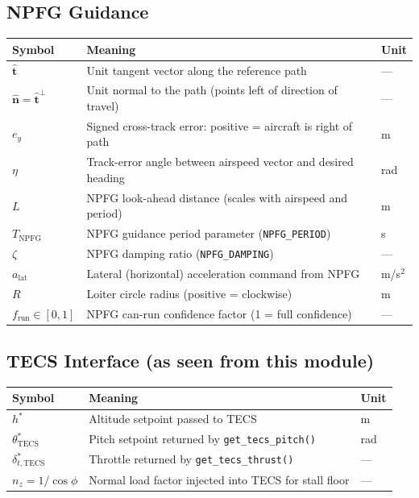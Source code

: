 \documentclass[12pt,a4paper]{article}
\begin{document}
\subsection*{NPFG Guidance}
\begin{center}\begin{tabular}{lll}\toprule
Symbol & Meaning & Unit \\\midrule
$\hat{\mathbf{t}}$ & Unit tangent vector along the reference path & --- \\
$\hat{\mathbf{n}} = \hat{\mathbf{t}}^{\perp}$ & Unit normal to the path (points left of direction of travel) & --- \\
$e_y$ & Signed cross-track error: positive = aircraft is right of path & m \\
$\eta$ & Track-error angle between airspeed vector and desired heading & rad \\
$L$ & NPFG look-ahead distance (scales with airspeed and period) & m \\
$T_{\text{NPFG}}$ & NPFG guidance period parameter (\texttt{NPFG\_PERIOD}) & s \\
$\zeta$ & NPFG damping ratio (\texttt{NPFG\_DAMPING}) & --- \\
$a_{\text{lat}}$ & Lateral (horizontal) acceleration command from NPFG & m/s$^2$ \\
$R$ & Loiter circle radius (positive = clockwise) & m \\
$f_{\text{run}} \in [0,1]$ & NPFG can-run confidence factor (1 = full confidence) & --- \\
\bottomrule\end{tabular}\end{center}

\subsection*{TECS Interface (as seen from this module)}
\begin{center}\begin{tabular}{lll}\toprule
Symbol & Meaning & Unit \\\midrule
$h^*$ & Altitude setpoint passed to TECS & m \\
$\theta^*_{\text{TECS}}$ & Pitch setpoint returned by \texttt{get\_tecs\_pitch()} & rad \\
$\delta^*_{t,\text{TECS}}$ & Throttle returned by \texttt{get\_tecs\_thrust()} & --- \\
$n_z = 1/\cos\phi$ & Normal load factor injected into TECS for stall floor & --- \\
\bottomrule\end{tabular}\end{center}
\end{document}
